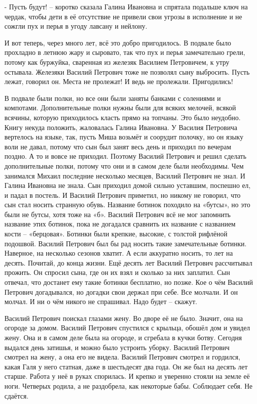 - Пусть будут! – коротко сказала Галина Ивановна и спрятала подальше ключ на чердак, чтобы дети в её отсутствие не привели свои угрозы в исполнение и не сожгли пух и перья в угоду лавсану и нейлону.

И вот теперь, через много лет, всё это добро пригодилось. В подвале было
прохладно в летнюю жару и сыровато, так что пух и перья замечательно грели,
потому как буржуйка, сваренная из железяк Василием Петровичем, к утру остывала.
Железяки Василий Петрович тоже не позволял сыну выбросить. Пусть лежат, говорил
он. Места не пролежат! И ведь не пролежали. Пригодились!

В подвале были полки, но все они были заняты банками с солениями и компотами.
Дополнительные полки нужны были для всяких мелочей, всякой всячины, которую
приходилось класть прямо на топчаны. Это было неудобно. Книгу некуда положить,
жаловалась Галина Ивановна. У Василия Петровича вертелось на языке, так, пусть
Миша возьмёт и соорудит полочку, но он языку воли не давал, потому что сын был
занят весь день и приходил по вечерам поздно. А то и вовсе не приходил. Поэтому
Василий Петрович и решил сделать дополнительные полки, потому что они и в самом
деле были необходимы. Чем занимался Михаил последние несколько месяцев, Василий
Петрович не знал. И Галина Ивановна не знала. Сын приходил домой сильно
уставшим, поспешно ел, и падал в постель. И Василий Петрович приметил, но
никому не говорил, что сын стал носить странную обувь. Название ботинок
походило на «бутсы», но это были не бутсы, хотя тоже на «б». Василий Петрович
всё не мог запомнить название этих ботинок, пока не догадался сравнить их
название с названием кости – «берцовая». Ботинки были крепкие, высокие, с
толстой рифлёной подошвой. Василий Петрович был бы рад носить такие
замечательные ботинки. Наверное, на несколько сезонов хватит. А если аккуратно
носить, то лет на десять. Почитай, до конца жизни. Ещё десять лет Василий
Петрович рассчитывал прожить. Он спросил сына, где он их взял и сколько за них
заплатил. Сын отвечал, что достанет ему такие ботинки бесплатно, но позже. Кое
о чём Василий Петрович догадывался, но догадки свои держал при себе. Все
молчали. И он молчал. И ни о чём никого не спрашивал. Надо будет – скажут.

Василий Петрович поискал глазами жену. Во дворе её не было. Значит, она на
огороде за домом. Василий Петрович спустился с крыльца, обошёл дом и увидел
жену. Она и в самом деле была на огороде, и сгребала в кучки ботву. Сегодня
выдался день затишья, и можно было устроить уборку.  Василий Петрович смотрел
на жену, а она его не видела. Василий Петрович смотрел и гордился, какая Галя у
него статная, даже в шестьдесят два года. Он же был на десять лет старше.
Работа у неё в руках спорилась. И крепко и уверенно стояли на земле её ноги.
Четверых родила, а не раздобрела, как некоторые бабы. Соблюдает себя. Не
сдаётся.

